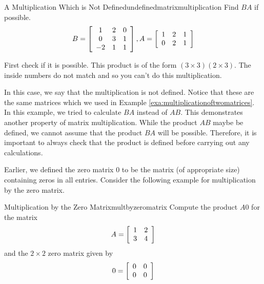 \begin{example}{A Multiplication Which is Not Defined}{undefinedmatrixmultiplication}
Find $BA$ if possible.
\begin{equation*}
B = \left[
\begin{array}{ccc}
1 & 2 & 0 \\
0 & 3 & 1 \\
-2 & 1 & 1
\end{array}
\right],  A = \left[
\begin{array}{ccc}
1 & 2 & 1 \\
0 & 2 & 1
\end{array}
\right]
\end{equation*}
\end{example}

\begin{solution} First check if it is possible. This product is of the form $\left( 3\times 3\right)
\left( 2\times 3\right) .$ The inside numbers do not match and so you can't
do this multiplication. 
\end{solution}

In this case, we say that the multiplication is not defined. 
Notice that these are the same matrices which we used in Example \ref{exa:multiplicationoftwomatrices}.
In this example, we tried to calculate $BA$ instead of $AB$. This demonstrates another property 
of matrix multiplication. While the product $AB$ maybe be defined, we cannot assume that
the product $BA$ will be possible. Therefore, it is important to always check that the product is defined
before carrying out any calculations.

Earlier, we defined the zero matrix $0$ to be the matrix (of
appropriate size) containing zeros in all entries.  Consider the
following example for multiplication by the zero matrix.

\begin{example}{Multiplication by the Zero Matrix}{multbyzeromatrix}
Compute the product $A0$ for the matrix
\begin{equation*}
A=
\left[
\begin{array}{rr}
1 & 2 \\
3 & 4
\end{array}
\right]
\end{equation*}
and the $2 \times 2$ zero matrix given by
\begin{equation*}
0=
\left[
\begin{array}{rr}
0 & 0 \\
0 & 0
\end{array}
\right]
\end{equation*}
\end{example}

